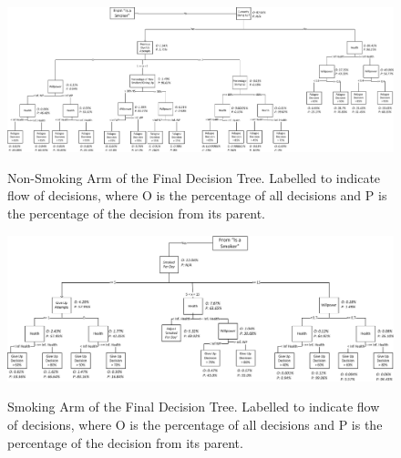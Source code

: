 \documentclass[]{report}
\begin{document}
\begin{landscape}
\begin{figure}
\begin{center}
\includegraphics[width=\paperwidth,keepaspectratio]{dectree-right-labelled.png}
\label{img:dectree-right-lab}
\caption{Non-Smoking Arm of the Final Decision Tree. Labelled to indicate flow of decisions, where O is the percentage of all decisions and P is the percentage of the decision from its parent.}
\end{center}
\end{figure}
\end{landscape}

\begin{landscape}
\begin{figure}
\begin{center}
\includegraphics[width=\paperwidth,keepaspectratio]{dectree-left-label.png}
\label{img:dectree-left-lab}
\caption{Smoking Arm of the Final Decision Tree. Labelled to indicate flow of decisions, where O is the percentage of all decisions and P is the percentage of the decision from its parent.}
\end{center}
\end{figure}
\end{landscape}
\end{document}
